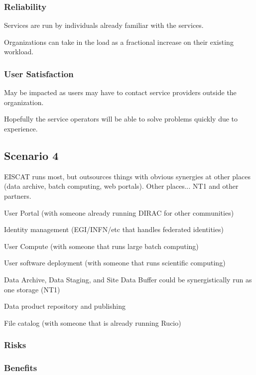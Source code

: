 \documentclass[12pt,a4paper]{article}
\begin{document}
\subsubsection*{Reliability}
\bitm
\item Services are run by individuals already familiar with the services.
\item Organizations can take in the \ED load as a fractional increase on their existing workload.
\eitm

\subsubsection*{User Satisfaction}
\bitm
\item May be impacted as users may have to contact service providers outside the \EC organization.
  \item Hopefully the service operators will be able to solve problems quickly due to experience.
\eitm

\subsection{Scenario 4}
\label{ssec:scen4}

EISCAT runs most, but outsources things with obvious synergies at other places (data archive, batch computing, web portals).
Other places... NT1 and other partners.

User Portal (with someone already running DIRAC for other communities)

Identity management (EGI/INFN/etc that handles federated identities)

User Compute (with someone that runs large batch computing)

User software deployment (with someone that runs scientific computing)

Data Archive, Data Staging, and Site Data Buffer could be synergistically run as one storage (NT1)

Data product repository and publishing

File catalog (with someone that is already running Rucio)

\subsubsection*{Risks}
\bitm
\item 
\eitm

\subsubsection*{Benefits}
\bitm
\item 
\eitm
\end{document}
